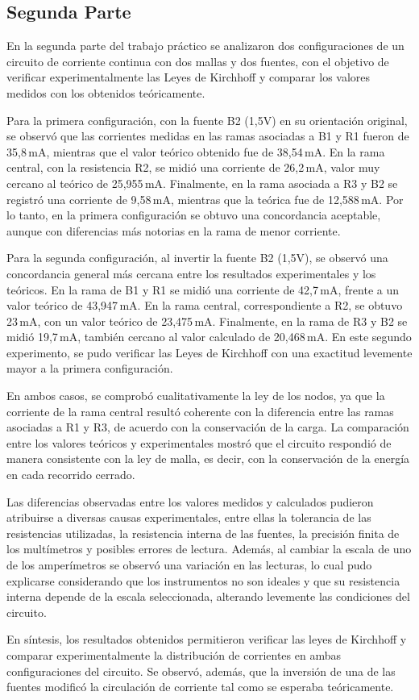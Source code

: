 

\subsection{Segunda Parte}
En la segunda parte del trabajo pr\'actico se analizaron dos configuraciones de un circuito de corriente continua con dos mallas y dos fuentes, con el objetivo de verificar experimentalmente las Leyes de Kirchhoff y comparar los valores medidos con los obtenidos te\'oricamente.

Para la primera configuraci\'on, con la fuente B2 (1,5V) en su orientaci\'on original, se observ\'o que las corrientes medidas en las ramas asociadas a B1 y R1 fueron de 35,8\,mA, mientras que el valor te\'orico obtenido fue de 38,54\,mA. En la rama central, con la resistencia R2, se midi\'o una corriente de 26,2\,mA, valor muy cercano al te\'orico de 25,955\,mA. Finalmente, en la rama asociada a R3 y B2 se registr\'o una corriente de 9,58\,mA, mientras que la te\'orica fue de 12,588\,mA. Por lo tanto, en la primera configuraci\'on se obtuvo una concordancia aceptable, aunque con diferencias m\'as notorias en la rama de menor corriente.

Para la segunda configuraci\'on, al invertir la fuente B2 (1,5V), se observ\'o una concordancia general m\'as cercana entre los resultados experimentales y los te\'oricos. En la rama de B1 y R1 se midi\'o una corriente de 42,7\,mA, frente a un valor te\'orico de 43,947\,mA. En la rama central, correspondiente a R2, se obtuvo 23\,mA, con un valor te\'orico de 23,475\,mA. Finalmente, en la rama de R3 y B2 se midi\'o 19,7\,mA, tambi\'en cercano al valor calculado de 20,468\,mA. En este segundo experimento, se pudo verificar las Leyes de Kirchhoff con una exactitud levemente mayor a la primera configuraci\'on.

En ambos casos, se comprob\'o cualitativamente la ley de los nodos, ya que la corriente de la rama central result\'o coherente con la diferencia entre las ramas asociadas a R1 y R3, de acuerdo con la conservaci\'on de la carga. La comparaci\'on entre los valores te\'oricos y experimentales mostr\'o que el circuito respondi\'o de manera consistente con la ley de malla, es decir, con la conservaci\'on de la energ\'ia en cada recorrido cerrado.

Las diferencias observadas entre los valores medidos y calculados pudieron atribuirse a diversas causas experimentales, entre ellas la tolerancia de las resistencias utilizadas, la resistencia interna de las fuentes, la precisi\'on finita de los mult\'imetros y posibles errores de lectura. Adem\'as, al cambiar la escala de uno de los amper\'imetros se observ\'o una variaci\'on en las lecturas, lo cual pudo explicarse considerando que los instrumentos no son ideales y que su resistencia interna depende de la escala seleccionada, alterando levemente las condiciones del circuito.

En s\'intesis, los resultados obtenidos permitieron verificar las leyes de Kirchhoff y comparar experimentalmente la distribuci\'on de corrientes en ambas configuraciones del circuito. Se observ\'o, adem\'as, que la inversi\'on de una de las fuentes modific\'o la circulaci\'on de corriente tal como se esperaba te\'oricamente.

\newpage
